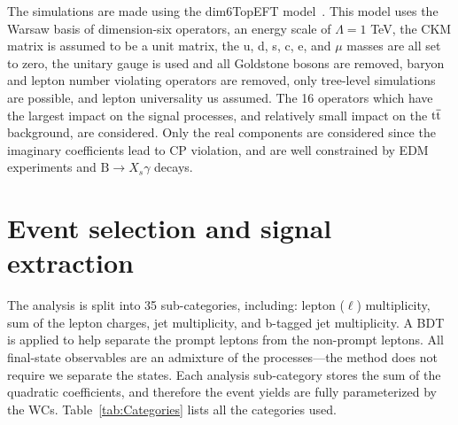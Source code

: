 \documentclass[12pt]{article}
\begin{document}
The simulations are made using the dim6TopEFT model~\cite{AguilarSaavedra:2018nen}. This model uses the Warsaw basis of dimension-six operators, an energy scale of $\Lambda=1$ TeV, the CKM matrix is assumed to be a unit matrix, the u, d, s, c, e, and $\mu$ masses are all set to zero, the unitary gauge is used and all Goldstone bosons are removed, baryon and lepton number violating operators are removed, only tree-level simulations are possible, and lepton universality us assumed. The 16 operators which have the largest impact on the signal processes, and relatively small impact on the $\mathrm{t\overline{t}}$ background, are considered. Only the real components are considered since the imaginary coefficients lead to CP violation, and are well constrained by EDM experiments and $\mathrm{B} \to X_s \gamma$ decays.

\section{Event selection and signal extraction}

The analysis is split into 35 sub-categories, including: lepton ($\ell$) multiplicity, sum of the lepton charges, jet multiplicity, and b-tagged jet multiplicity. A BDT is applied to help separate the prompt leptons from the non-prompt leptons. All final-state observables are an admixture of the processes---the method does not require we separate the states. Each analysis sub-category stores the sum of the quadratic coefficients, and therefore the event yields are fully parameterized by the WCs. Table~\ref{tab:Categories} lists all the categories used.\\
\end{document}
